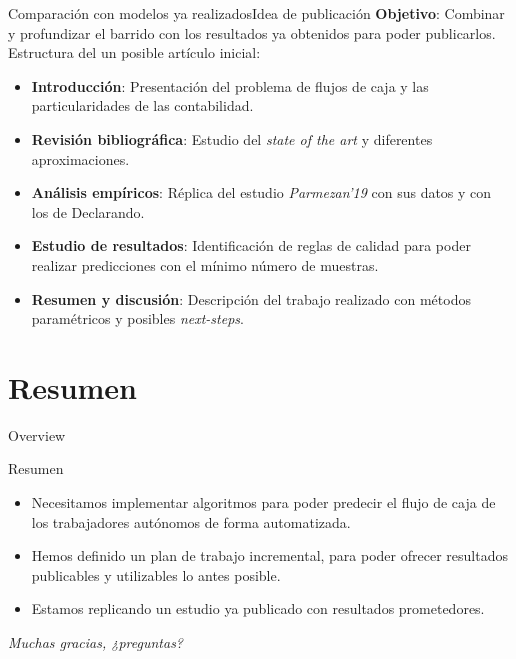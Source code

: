 \documentclass[12pt, aspectratio=169]{beamer} %
\begin{document}
\begin{frame}{Comparación con modelos ya realizados}{Idea de publicación}
  \textbf{Objetivo}: Combinar y profundizar el barrido con los resultados ya obtenidos para poder publicarlos.
  Estructura del un posible artículo inicial:
  \begin{itemize}
  \item \textbf{Introducción}: Presentación del problema de flujos de caja y las particularidades de las contabilidad.
  \item \textbf{Revisión bibliográfica}: Estudio del \textit{state of the art} y diferentes aproximaciones.
  \item \textbf{Análisis empíricos}: Réplica del estudio \textit{Parmezan'19} con sus datos y con los de Declarando.
  \item \textbf{Estudio de resultados}: Identificación de reglas de calidad para poder realizar predicciones con el mínimo número de muestras.
  \item \textbf{Resumen y discusión}: Descripción del trabajo realizado con métodos paramétricos y posibles \textit{next-steps}.
  \end{itemize}
\end{frame}



\section{Resumen}

\begin{frame}{Overview}
\tableofcontents
\end{frame}


\begin{frame}{Resumen}
  \begin{itemize}
  \item Necesitamos implementar algoritmos para poder predecir el flujo de caja de los trabajadores autónomos de forma automatizada.
  \item Hemos definido un plan de trabajo incremental, para poder ofrecer resultados publicables y utilizables lo antes posible.
  \item Estamos replicando un estudio ya publicado con resultados prometedores.
  \end{itemize}
\end{frame}


\begin{frame}{}
  \centering \Large
  \emph{Muchas gracias, ¿preguntas?}
\end{frame}
\end{document}
